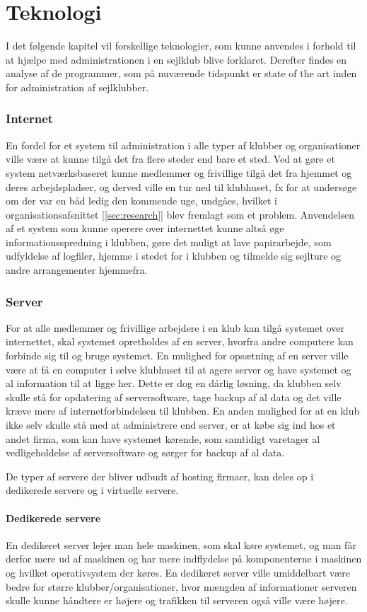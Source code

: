 \chapter{Teknologi}\label{chap:teknologi-analyse}
I det følgende kapitel vil forskellige teknologier, som kunne anvendes i forhold til at hjælpe med administrationen i en sejlklub blive forklaret.
Derefter findes en analyse af de programmer, som på nuværende tidspunkt er state of the art inden for administration af sejlklubber.  
\subsection*{Internet}
En fordel for et system til administration i alle typer af klubber og organisationer ville være at kunne tilgå det fra flere steder end bare et sted. 
Ved at gøre et system netværksbaseret kunne medlemmer og frivillige tilgå det fra hjemmet og deres arbejdspladser, og derved ville en tur ned til klubhuset, fx for at undersøge om der var en båd ledig den kommende uge, undgåes, hvilket i organisationsafsnittet [\ref{sec:research}] blev fremlagt som et problem. 
Anvendelsen af et system som kunne operere over internettet kunne altså øge informationsspredning i klubben, gøre det muligt at lave papirarbejde, som udfyldelse af logfiler, hjemme i stedet for i klubben og tilmelde sig sejlture og andre arrangementer hjemmefra.
  
\subsection*{Server}
For at alle medlemmer og frivillige arbejdere i en klub kan tilgå systemet over internettet, skal systemet opretholdes af en server, hvorfra andre computere kan forbinde sig til og bruge systemet. 
En mulighed for opsætning af en server ville være at få en computer i selve klubhuset til at agere server og have systemet og al information til at ligge her. 
Dette er dog en dårlig løsning, da klubben selv skulle stå for opdatering af serversoftware, tage backup af al data og det ville kræve mere af internetforbindelsen til klubben. 
En anden mulighed for at en klub ikke selv skulle stå med at administrere end server, er at købe sig ind hos et andet firma, som kan have systemet kørende, som samtidigt varetager al vedligeholdelse af serversoftware og sørger for backup af al data.

De typer af servere der bliver udbudt af hosting firmaer, kan deles op i dedikerede servere og i virtuelle servere.
\subsubsection*{Dedikerede servere}
En dedikeret server lejer man hele maskinen, som skal køre systemet, og man får derfor mere ud af maskinen og har mere indflydelse på komponenterne i maskinen og hvilket operativsystem der køres.
En dedikeret server ville umiddelbart være bedre for større klubber/organisationer, hvor mængden af informationer serveren skulle kunne håndtere er højere og trafikken til serveren også ville være højere.
